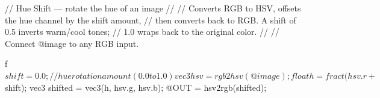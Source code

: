 // Hue Shift — rotate the hue of an image
//
// Converts RGB to HSV, offsets the hue channel by the shift amount,
// then converts back to RGB. A shift of 0.5 inverts warm/cool tones;
// 1.0 wraps back to the original color.
//
// Connect @image to any RGB input.

f$shift = 0.0;   // hue rotation amount (0.0 to 1.0)

vec3 hsv = rgb2hsv(@image);
float h = fract(hsv.r + $shift);
vec3 shifted = vec3(h, hsv.g, hsv.b);
@OUT = hsv2rgb(shifted);